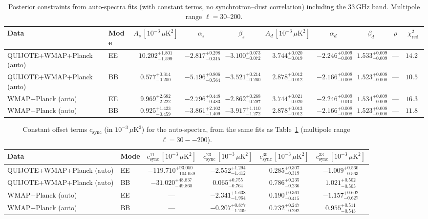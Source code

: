\begin{table}[h]
\centering
\scriptsize
\setlength{\tabcolsep}{4pt}
\caption{Posterior constraints from auto-spectra fits (with constant terms, no synchrotron--dust correlation) including the 33\,GHz band. Multipole range $\ell=30$--$200$.}
\label{tab:fit_results_auto_with33}
\begin{tabular}{llcccccccc}
\toprule
Data & Mode & $A_s\,[10^{-3}\,\mu\mathrm{K}^2]$ & $\alpha_s$ & $\beta_s$ & $A_d\,[10^{-3}\,\mu\mathrm{K}^2]$ & $\alpha_d$ & $\beta_d$ & $\rho$ & $\chi^2_\mathrm{red}$ \\
\midrule
QUIJOTE+WMAP+Planck (auto) & EE & $10.202^{+1.801}_{-1.599}$ & $-2.817^{+0.298}_{-0.315}$ & $-3.100^{+0.073}_{-0.072}$ & $3.744^{+0.020}_{-0.019}$ & $-2.246^{+0.009}_{-0.009}$ & $1.533^{+0.009}_{-0.009}$ & --- & $14.29$ \\
QUIJOTE+WMAP+Planck (auto) & BB & $0.577^{+0.314}_{-0.200}$ & $-5.196^{+0.806}_{-0.564}$ & $-3.521^{+0.214}_{-0.260}$ & $2.878^{+0.012}_{-0.012}$ & $-2.166^{+0.008}_{-0.008}$ & $1.523^{+0.008}_{-0.008}$ & --- & $10.53$ \\
WMAP+Planck (auto) & EE & $9.969^{+2.682}_{-2.222}$ & $-2.796^{+0.448}_{-0.483}$ & $-2.862^{+0.268}_{-0.297}$ & $3.744^{+0.021}_{-0.020}$ & $-2.246^{+0.009}_{-0.010}$ & $1.534^{+0.009}_{-0.009}$ & --- & $16.38$ \\
WMAP+Planck (auto) & BB & $0.925^{+1.423}_{-0.459}$ & $-3.861^{+2.102}_{-1.409}$ & $-3.917^{+1.110}_{-1.272}$ & $2.878^{+0.013}_{-0.012}$ & $-2.166^{+0.008}_{-0.008}$ & $1.523^{+0.008}_{-0.008}$ & --- & $11.87$ \\
\bottomrule
\end{tabular}
\end{table}

\begin{table}[h]
\centering
\scriptsize
\setlength{\tabcolsep}{4pt}
\caption{Constant offset terms $c_{\mathrm{sync}}$ (in $10^{-3}\,\mu\mathrm{K}^2$) for the auto-spectra, from the same fits as Table~\ref{tab:fit_results_auto_with33} (multipole range $\ell=30--200$).}
\label{tab:fit_results_auto_with33_c_terms}
\begin{tabular}{llcccc}
\toprule
Data & Mode & $c_{\mathrm{sync}}^{11}\,[10^{-3}\,\mu\mathrm{K}^2]$ & $c_{\mathrm{sync}}^{23}\,[10^{-3}\,\mu\mathrm{K}^2]$ & $c_{\mathrm{sync}}^{30}\,[10^{-3}\,\mu\mathrm{K}^2]$ & $c_{\mathrm{sync}}^{33}\,[10^{-3}\,\mu\mathrm{K}^2]$ \\
\midrule
QUIJOTE+WMAP+Planck (auto) & EE & $-119.710^{+93.050}_{-104.059}$ & $-2.552^{+1.294}_{-1.412}$ & $0.285^{+0.307}_{-0.319}$ & $-1.009^{+0.560}_{-0.563}$ \\
QUIJOTE+WMAP+Planck (auto) & BB & $-31.020^{+48.837}_{-49.860}$ & $0.065^{+0.755}_{-0.764}$ & $0.786^{+0.235}_{-0.236}$ & $1.021^{+0.502}_{-0.505}$ \\
WMAP+Planck (auto) & EE & --- & $-2.341^{+1.638}_{-1.964}$ & $0.190^{+0.361}_{-0.415}$ & $-1.157^{+0.602}_{-0.627}$ \\
WMAP+Planck (auto) & BB & --- & $-0.207^{+0.877}_{-1.209}$ & $0.732^{+0.247}_{-0.292}$ & $0.955^{+0.511}_{-0.543}$ \\
\bottomrule
\end{tabular}
\end{table}
